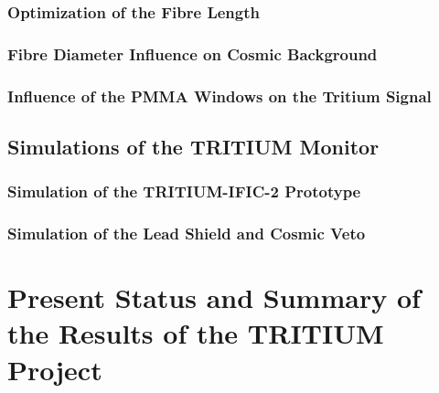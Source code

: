 \documentclass[12pt,a4paper]{book}
\begin{document}
		\subsection{Optimization of the Fibre Length}\label{subsec:FiberLengthSimulation}
		
				
		\subsection{Fibre Diameter Influence on Cosmic Background}\label{subsec:FiberDiameterSimulation}
		
		
		\subsection[Influence of the PMMA Windows on the Tritium Signal]{Influence of the PMMA Windows on the Tritium Signal}\label{subsec:PMMAWindowsSimulation}
			
						
	\section{Simulations of the TRITIUM Monitor}\label{sec:TRITIUMMonitorSimulation}
	
		
		\subsection{Simulation of the TRITIUM-IFIC-2 Prototype}\label{subsec:TritiumIFIC2Simulation}
		
		
		\subsection[Lead Shield and Cosmic Veto]{Simulation of the Lead Shield and Cosmic Veto}\label{subsec:LeadCosmicSimulation}
		
		\newpage
		
\fancyhead[LE]{\leftmark}

\chapter{Present Status and Summary of the Results of the TRITIUM Project}  \label{chap:Summary}

\newpage
\end{document}
